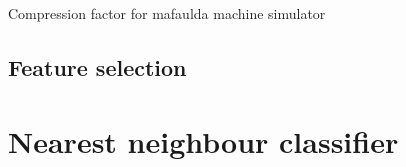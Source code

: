 Compression factor for mafaulda machine simulator


 



\subsection{Feature selection}


%   
%     




\section{Nearest neighbour classifier}

